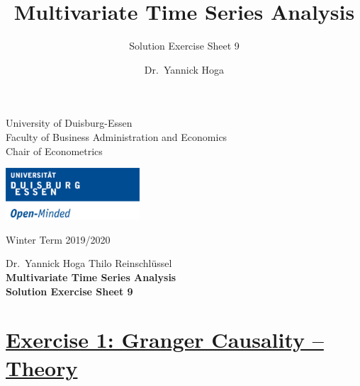 \documentclass[12pt,a4paper]{article}
\title{Multivariate Time Series Analysis}
\subtitle{Solution Exercise Sheet 9}
\author{Dr.~Yannick Hoga}
\date{}
\newcommand{\tmpsection}[1]{}
\let\tmpsection=\section
\renewcommand{\section}[1]{\tmpsection{\underline{#1}} }
\begin{document}





\restoregeometry



\begin{minipage}{0.6\textwidth}
University of Duisburg-Essen\\
Faculty of Business Administration and Economics\\
Chair of Econometrics\\
\end{minipage}

	\begin{flushright}
	\vspace{-3cm}
	\includegraphics*[width=5cm]{../Includes/duelogo_en.png}\\
	\vspace{.125cm}
	\end{flushright}
\hspace{-0.005cm}Winter Term 2019/2020

\vspace{0.05cm}

\begin{center}
	\vspace{.25cm}
	Dr.~Yannick Hoga \hspace{.5cm} Thilo Reinschlüssel \\
	\vspace{.25cm}
	\textbf{\Large{Multivariate Time Series Analysis}}\\
	\vspace{.25cm}
	\textbf{\large{Solution Exercise Sheet 9}}\\
	\vspace{.125cm}
\end{center}





\hypertarget{exercise-1-granger-causality-theory}{%
\section{Exercise 1: Granger Causality --
Theory}\label{exercise-1-granger-causality-theory}}
\end{document}
